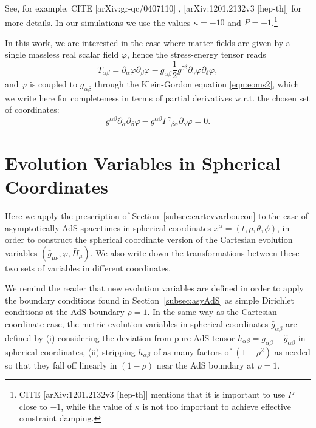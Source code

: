 \documentclass[a4paper,11pt]{article}
\numberwithin{equation}{section}
\begin{document}
See, for example, CITE [arXiv:gr-qc/0407110] , [arXiv:1201.2132v3 [hep-th]] for more details. In our simulations we use the values $\kappa=-10$ and $P=-1$.\footnote{CITE [arXiv:1201.2132v3 [hep-th]] mentions that it is important to use $P$ close to $-1$, while the value of $\kappa$ is not too important to achieve effective constraint damping.}

In this work, we are interested in the case where matter fields are given by a single massless real scalar field $\varphi$, hence the stress-energy tensor reads
\begin{equation}
\label{eq:KHmomtens}
T_{\alpha\beta}=\partial_\alpha \varphi \partial_\beta \varphi - g_{\alpha\beta} \frac{1}{2} g^{\gamma\delta} \partial_{\gamma} \varphi \partial_{\delta} \varphi,
\end{equation}
and $\varphi$ is coupled to $g_{\alpha\beta}$ through the Klein-Gordon equation \eqref{eqn:eoms2}, which we write here for completeness in terms of partial derivatives w.r.t. the chosen set of coordinates:
\begin{equation}\label{eqn:eoms2cart}
g^{\alpha\beta} \partial_{\alpha} \partial_{\beta} \varphi -g^{\alpha\beta} \Gamma^{\gamma}{}_{\beta\alpha}\partial_\gamma\varphi= 0.
\end{equation}

\section{Evolution Variables in Spherical Coordinates}\label{sec:sphevvarboucon}

Here we apply the prescription of Section~\ref{subsec:cartevvarboucon} to the case of asymptotically AdS spacetimes in spherical coordinates $x^\alpha=(t,\rho,\theta,\phi)$, in order to construct the spherical coordinate version of the Cartesian evolution variables $(\bar{g}_{\mu\nu},\bar{\varphi},\bar{H}_\mu)$. We also write down the transformations between these two sets of variables in different coordinates.

We remind the reader that new evolution variables are defined in order to apply the boundary conditions found in Section~\ref{subsec:asyAdS} as simple Dirichlet conditions at the AdS boundary $\rho=1$. In the same way as the Cartesian coordinate case, the metric evolution variables in spherical coordinates $\bar{g}_{\alpha\beta}$ are defined by (i) considering the deviation from pure AdS tensor $h_{\alpha\beta}=g_{\alpha\beta}-\hat{g}_{\alpha\beta}$ in spherical coordinates, (ii) stripping $h_{\alpha\beta}$ of as many factors of $(1-\rho^2)$ as needed so that they fall off linearly in $(1-\rho)$ near the AdS boundary at $\rho=1$.
\end{document}
